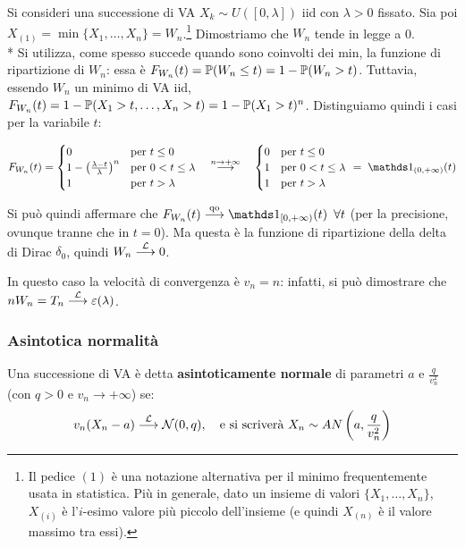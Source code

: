 \begin{ese}
  Si consideri una successione di VA $X_k \sim U([0, \lambda])$ iid con $\lambda > 0$ fissato. Sia poi $X_{(1)} = \min\{X_1, \dots, X_n\} = W_n$.\footnote{Il pedice $(1)$ è una notazione alternativa per il minimo frequentemente usata in statistica. Più in generale, dato un insieme di valori $\{X_1,\dots,X_n\}$, $X_{(i)}$ è l'$i$-esimo valore più piccolo dell'insieme (e quindi $X_{(n)}$ è il valore massimo tra essi).}
  Dimostriamo che $W_n$ tende in legge a 0. \\*
  Si utilizza, come spesso succede quando sono coinvolti dei min, la funzione di ripartizione di $W_n$: essa è $F_{W_n} (t) = \mathbb P(W_n \leq t) = 1-\mathbb P(W_n > t)$. Tuttavia, essendo $W_n$ un minimo di VA iid, $F_{W_n}(t) = 1-\mathbb P(X_1 > t, \dots, X_n > t) = 1- \mathbb P (X_1 > t)^n$. Distinguiamo quindi i casi per la variabile $t$:

  $$F_{W_n} (t) = \begin{cases} 0 &\text{per }t \leq 0 \\ 1-\left( \frac{\lambda-t}{\lambda}\right)^n &\text{per }0 < t \leq \lambda \\ 1 &\text{per }t > \lambda \end{cases} \quad \stackrel{n \to +\infty}{\longrightarrow} \quad \begin{cases} 0 &\text{per }t \leq 0 \\ 1 &\text{per }0 < t \leq \lambda \\ 1 &\text{per }t > \lambda \end{cases} \; = \;\Ind_{(0, +\infty)} (t)$$

  Si può quindi affermare che $F_{W_n}(t) \stackrel{\text{qo}}{\longrightarrow} \Ind_{[0, +\infty)} (t) \enspace \forall t$ (per la precisione, ovunque tranne che in $t=0$).
  Ma questa è la funzione di ripartizione della delta di Dirac $\delta_0$, quindi $W_n \stackrel{\mathcal L}{\longrightarrow} 0$.

  In questo caso la velocità di convergenza è $v_n = n$: infatti, si può dimostrare che $n W_n = T_n \stackrel{\mathcal L}{\longrightarrow} \varepsilon(\lambda)$.
\end{ese}

\subsubsection{Asintotica normalità}

\begin{defn}
  Una successione di VA è detta \textbf{asintoticamente normale} di parametri $a$ e $\frac{q}{v_n^2}$ (con $q > 0$ e $v_n \to +\infty$) se:
  $$v_n(X_n-a) \stackrel{\mathcal L}{\longrightarrow} \mathcal N(0, q), \quad \text{e si scriverà }
  X_n \sim  AN \left(a,\frac{q}{v_n^2}\right)$$
\end{defn}

